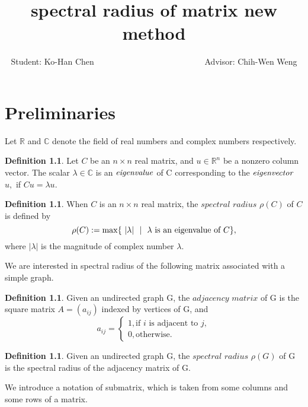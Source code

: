 \documentclass[12pt]{report}%
\title{spectral radius of matrix new method}
\author{Student: Ko-Han Chen  ~~~~~~~~~~~~~~~~~~~~~~~~~~Advisor: Chih-Wen Weng}
\date{} %
\theoremstyle{plain}
\theoremstyle{definition}
\newtheorem{defn}[thm]{Definition}
\begin{document}
\chapter{Preliminaries}

Let $\mathbb{R}$ and $\mathbb{C}$ denote the
 field of real numbers and complex numbers respectively.


\begin{defn}
    Let $C$ be an $n \times n$ real matrix, and $u \in \mathbb{R}^n$ be a
     nonzero column vector. The scalar $\lambda \in \mathbb{C}$ is an $\it{eigenvalue}$
      of C corresponding to the $\it{eigenvector}$ $u,$  if $Cu = \lambda u.$
   
\end{defn}

\begin{defn}

When $C$ is an $n \times n$ real matrix, the $\textit {spectral radius} $ $\rho(C)$ of $C$
 is defined by 
 $$\rho(C):=\max\{~|\lambda|~\ |~~\lambda\hbox{ is an eigenvalue of $C$}\},$$
where $|\lambda|$ is the magnitude of complex number $\lambda.$
\end{defn}

We are interested in spectral radius of the following matrix associated with a simple graph.

\begin{defn}
    Given an undirected graph G, the$\textit{ adjacency matrix}$ of G is the square
     matrix $A = (a_{ij})$ indexed by vertices of G, and
      \[a_{ij} =\begin{cases}
    1, \text{if $i$ is adjacent to $j$}, \\
    0, \text{otherwise.}
                \end{cases}
    \]
\end{defn}

\begin{defn}
Given an undirected graph G, the $\textit{spectral radius}$  $\rho(G) $ of G is the spectral
 radius of the adjacency matrix of G.
\end{defn}

    We introduce a notation of submatrix, which is taken from some columns and some rows of a
     matrix.
\end{document}
